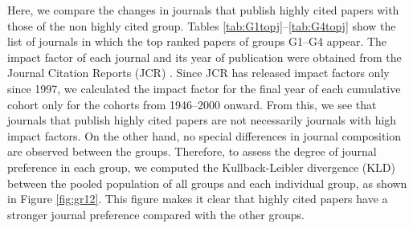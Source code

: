 Here, we compare the changes in journals that publish highly cited papers with those of the non highly cited group. Tables \ref{tab:G1topj}–\ref{tab:G4topj} show the list of journals in which the top ranked papers of groups G1–G4 appear. The impact factor of each journal and its year of publication were obtained from the Journal Citation Reports (JCR) \cite{JCR1}. Since JCR has released impact factors only since 1997, we calculated the impact factor for the final year of each cumulative cohort only for the cohorts from 1946–2000 onward. From this, we see that journals that publish highly cited papers are not necessarily journals with high impact factors. On the other hand, no special differences in journal composition are observed between the groups. Therefore, to assess the degree of journal preference in each group, we computed the Kullback-Leibler divergence (KLD) between the pooled population of all groups and each individual group, as shown in Figure \ref{fig:gr12}. This figure makes it clear that highly cited papers have a stronger journal preference compared with the other groups.
